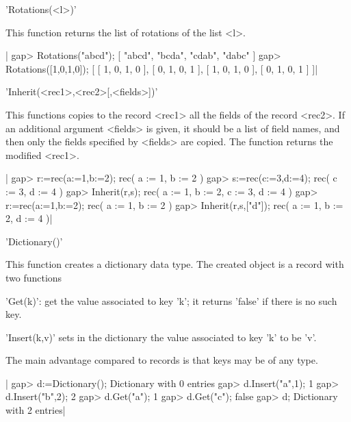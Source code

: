 %
%

'Rotations(<l>)'

This function returns the list of rotations of the list <l>.

|    gap> Rotations("abcd");
    [ "abcd", "bcda", "cdab", "dabc" ]
    gap> Rotations([1,0,1,0]);
    [ [ 1, 0, 1, 0 ], [ 0, 1, 0, 1 ], [ 1, 0, 1, 0 ], [ 0, 1, 0, 1 ] ]|

%
%

'Inherit(<rec1>,<rec2>[,<fields>])'

This  functions copies to  the record <rec1>  all the fields  of the record
<rec2>. If an additional argument <fields> is given, it should be a list of
field names, and then only the fields specified by <fields> are copied. The
function returns the modified <rec1>.

|    gap> r:=rec(a:=1,b:=2);
    rec(
      a := 1,
      b := 2 )
    gap> s:=rec(c:=3,d:=4);
    rec(
      c := 3,
      d := 4 )
    gap> Inherit(r,s);
    rec(
      a := 1,
      b := 2,
      c := 3,
      d := 4 )
    gap> r:=rec(a:=1,b:=2);
    rec(
      a := 1,
      b := 2 )
    gap> Inherit(r,s,["d"]);
    rec(
      a := 1,
      b := 2,
      d := 4 )|

%
%

'Dictionary()'

This  function  creates  a  dictionary  data  type. The created object is a
record  with two functions\: 

'Get(k)':  get the value associated to key 'k'; it returns 'false' if there
is no such key.

'Insert(k,v)'  sets in the dictionary the value associated to key 'k' to be
'v'.

The main advantage compared to records is that keys may be of any type.

|    gap> d:=Dictionary();
    Dictionary with 0 entries
    gap> d.Insert("a",1);
    1
    gap> d.Insert("b",2);
    2
    gap> d.Get("a");
    1
    gap> d.Get("c");
    false
    gap> d;
    Dictionary with 2 entries|

%
%

